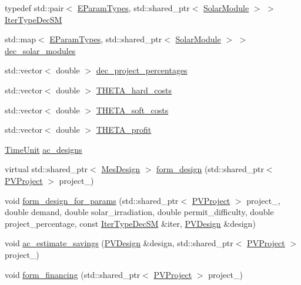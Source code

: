 \begin{DoxyCompactItemize}
\item 
typedef std\+::pair$<$ \hyperlink{namespacesolar__core_aa1147341e5ef7a40d68d1bd68e149362}{E\+Param\+Types}, std\+::shared\+\_\+ptr$<$ \hyperlink{classsolar__core_1_1_solar_module}{Solar\+Module} $>$ $>$ \hyperlink{classsolar__core_1_1_s_e_i_a039ba7d0f4561aec82bd96636de534a5}{Iter\+Type\+Dec\+S\+M}
\item 
std\+::map$<$ \hyperlink{namespacesolar__core_aa1147341e5ef7a40d68d1bd68e149362}{E\+Param\+Types}, std\+::shared\+\_\+ptr$<$ \hyperlink{classsolar__core_1_1_solar_module}{Solar\+Module} $>$ $>$ \hyperlink{classsolar__core_1_1_s_e_i_a79728143af5752e09c2be29cfa1cfd8f}{dec\+\_\+solar\+\_\+modules}
\item 
std\+::vector$<$ double $>$ \hyperlink{classsolar__core_1_1_s_e_i_a272838ea17b8cd4e49c9a8c53facfd8f}{dec\+\_\+project\+\_\+percentages}
\item 
std\+::vector$<$ double $>$ \hyperlink{classsolar__core_1_1_s_e_i_a4723f6d0e5098b9b2f553c9ef6c5545f}{T\+H\+E\+T\+A\+\_\+hard\+\_\+costs}
\item 
std\+::vector$<$ double $>$ \hyperlink{classsolar__core_1_1_s_e_i_a1be690a943dc872af0ed3540c81f1d6b}{T\+H\+E\+T\+A\+\_\+soft\+\_\+costs}
\item 
std\+::vector$<$ double $>$ \hyperlink{classsolar__core_1_1_s_e_i_a9137f81a58ab1325d8b37590afe267aa}{T\+H\+E\+T\+A\+\_\+profit}
\item 
\hyperlink{namespacesolar__core_a4b5949d07259da6f8a20d12a30403e90}{Time\+Unit} \hyperlink{classsolar__core_1_1_s_e_i_a147ec60ca551d9195cdf5937eda5f903}{ac\+\_\+designs}
\item 
virtual std\+::shared\+\_\+ptr$<$ \hyperlink{classsolar__core_1_1_mes_design}{Mes\+Design} $>$ \hyperlink{classsolar__core_1_1_s_e_i_a807561ad055ddc0df91b80ba406ee6df}{form\+\_\+design} (std\+::shared\+\_\+ptr$<$ \hyperlink{classsolar__core_1_1_p_v_project}{P\+V\+Project} $>$ project\+\_\+)
\item 
void \hyperlink{classsolar__core_1_1_s_e_i_a0019e2ad3504adcb5a44e5002f1d0002}{form\+\_\+design\+\_\+for\+\_\+params} (std\+::shared\+\_\+ptr$<$ \hyperlink{classsolar__core_1_1_p_v_project}{P\+V\+Project} $>$ project\+\_\+, double demand, double solar\+\_\+irradiation, double permit\+\_\+difficulty, double project\+\_\+percentage, const \hyperlink{classsolar__core_1_1_s_e_i_a039ba7d0f4561aec82bd96636de534a5}{Iter\+Type\+Dec\+S\+M} \&iter, \hyperlink{classsolar__core_1_1_p_v_design}{P\+V\+Design} \&design)
\item 
void \hyperlink{classsolar__core_1_1_s_e_i_ab84401c625f5c459accf430535e4a06d}{ac\+\_\+estimate\+\_\+savings} (\hyperlink{classsolar__core_1_1_p_v_design}{P\+V\+Design} \&design, std\+::shared\+\_\+ptr$<$ \hyperlink{classsolar__core_1_1_p_v_project}{P\+V\+Project} $>$ project\+\_\+)
\item 
void \hyperlink{classsolar__core_1_1_s_e_i_a7f29b9fee74b984ed9b1c6983b2960e3}{form\+\_\+financing} (std\+::shared\+\_\+ptr$<$ \hyperlink{classsolar__core_1_1_p_v_project}{P\+V\+Project} $>$ project\+\_\+)
\end{DoxyCompactItemize}
